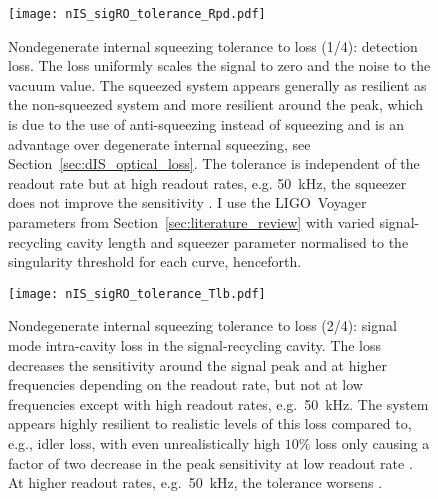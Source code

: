 \begin{figure}
    \centering
    \texttt{[image: nIS\_sigRO\_tolerance\_Rpd.pdf]}
    \caption{  Nondegenerate internal squeezing tolerance to loss (1/4): detection loss. The loss uniformly scales the signal to zero and the noise to the vacuum value. The squeezed system appears generally as resilient as the non-squeezed system and more resilient around the peak, which is due to the use of anti-squeezing instead of squeezing and is an advantage over degenerate internal squeezing, see Section~\ref{sec:dIS_optical_loss}. The tolerance is independent of the readout rate but at high readout rates, e.g. 50~kHz, the squeezer does not improve the sensitivity . I use the LIGO~Voyager parameters from Section~\ref{sec:literature_review} with varied signal-recycling cavity length  and squeezer parameter normalised to the singularity threshold for each curve, henceforth.}
    \label{fig:nIS_sigRO_tolerance_Rpd}
\end{figure}
\begin{figure}
    \centering
    \texttt{[image: nIS\_sigRO\_tolerance\_Tlb.pdf]}
    \caption{  Nondegenerate internal squeezing tolerance to loss (2/4): signal mode intra-cavity loss in the signal-recycling cavity. The loss decreases the sensitivity around the signal peak and at higher frequencies depending on the readout rate, but not at low frequencies except with high readout rates, e.g.\ 50~kHz. The system appears highly resilient to realistic levels of this loss compared to, e.g., idler loss, with even unrealistically high $10\%$ loss only causing a factor of two decrease in the peak sensitivity at low readout rate . At higher readout rates, e.g.\ 50~kHz, the tolerance worsens .
    }
    \label{fig:nIS_sigRO_tolerance_Tlb}
\end{figure}
